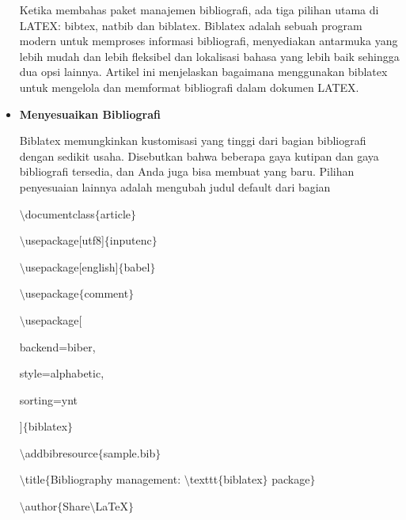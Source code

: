 \begin{itemize}
Ketika membahas paket manajemen bibliografi, ada tiga pilihan utama di LATEX: bibtex, natbib dan biblatex. Biblatex adalah sebuah program modern untuk memproses informasi bibliografi, menyediakan antarmuka yang lebih mudah dan lebih fleksibel dan lokalisasi bahasa yang lebih baik sehingga dua opsi lainnya. Artikel ini menjelaskan bagaimana menggunakan biblatex untuk mengelola dan memformat bibliografi dalam dokumen LATEX.\par

\vspace{12pt}
	\item {\fontsize{14pt}{14pt}\selectfont \textbf{Menyesuaikan Bibliografi}}\par

Biblatex memungkinkan kustomisasi yang tinggi dari bagian bibliografi dengan sedikit usaha. Disebutkan bahwa beberapa gaya kutipan dan gaya bibliografi tersedia, dan Anda juga bisa membuat yang baru. Pilihan penyesuaian lainnya adalah mengubah judul default dari bagian ~ \par

 $\setminus$documentclass$ \{ $article$ \} $\par

$\setminus$usepackage[utf8]$ \{ $inputenc$ \} $\par

$\setminus$usepackage[english]$ \{ $babel$ \} $\par

$\setminus$usepackage$ \{ $comment$ \} $\par

$\setminus$usepackage[\par

backend=biber,\par

style=alphabetic,\par

sorting=ynt\par

]$ \{ $biblatex$ \} $\par

$\setminus$addbibresource$ \{ $sample.bib$ \} $\par

$\setminus$title$ \{ $Bibliography management: $\setminus$texttt$ \{ $biblatex$ \} $ package$ \} $\par

$\setminus$author$ \{ $Share$\setminus$LaTeX$ \} $\par


\end{itemize}

